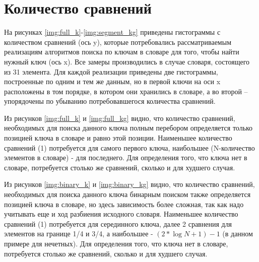 \section{Количество сравнений}

На рисунках \ref{img:full_k}-\ref{img:segment_kg} приведены гистограммы с количеством сравнений (ось y), которые потребовались рассматриваемым реализациям алгоритмов поиска по ключам в словаре для того, чтобы найти нужный ключ (ось x). Все замеры производились в случае словаря, состоящего из 31 элемента. Для каждой реализации приведены две гистограммы, построенные по одним и тем же данным, но в первой ключи на оси x расположены в том порядке, в котором они хранились в словаре, а во второй -- упорядочены по убыванию потребовавшегося количества сравнений.

\clearpage
{}

\clearpage
{}

\clearpage
{}

Из рисунков \ref{img:full_k} и \ref{img:full_kg} видно, что количество сравнений, необходимых для поиска данного ключа полным перебором определяется только позицией ключа в словаре и равно этой позиции. Наименьшее количество сравнений (1) потребуется для самого первого ключа, наибольшее (N-количество элементов в словаре) - для последнего. Для определения того, что ключа нет в словаре, потребуется столько же сравнений, сколько и для худшего случая.

Из рисунков \ref{img:binary_k} и \ref{img:binary_kg} видно, что количество сравнений, необходимых для поиска данного ключа бинарным поиском также определяется позицией ключа в словаре, но здесь зависимость более сложная, так как надо учитывать еще и ход разбиения исходного словаря. Наименьшее количество сравнений (1) потребуется для серединного ключа, далее 2 сравнения для элементов на границе 1/4 и 3/4, а наибольшее - $(2*\log{N+1}) - 1$ (в данном примере для нечетных). Для определения того, что ключа нет в словаре, потребуется столько же сравнений, сколько и для худшего случая.


